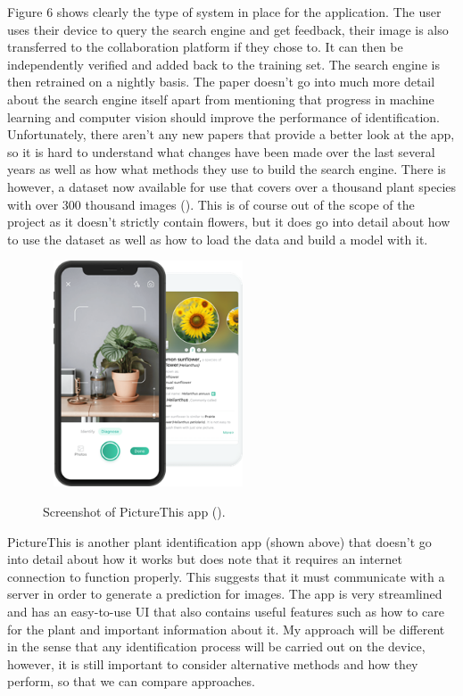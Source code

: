 \documentclass{article}
\begin{document}
Figure 6 shows clearly the type of system in place for the application. The user uses their device to query the search
engine and get feedback, their image is also transferred to the collaboration platform if they chose to. It can then be 
independently verified and added back to the training set. The search engine is then retrained on a nightly basis. The 
paper doesn't go into much more detail about the search engine itself apart from mentioning that progress in machine 
learning and computer vision should improve the performance of identification. Unfortunately, there aren't any new 
papers that provide a better look at the app, so it is hard to understand what changes have been made over the last 
several years as well as how what methods they use to build the search engine. There is however, a dataset now 
available for use that covers over a thousand plant species with over 300 thousand images 
(\cite{camille_garcin_2021_5645731}). This is of course out of the scope of the project as it doesn't strictly contain 
flowers, but it does go into detail about how to use the dataset as well as how to load the data and build a model with 
it.

\begin{figure}[h]\
    \centering
    \includegraphics[width=0.5\textwidth]{picturethis.png}
    \caption{Screenshot of PictureThis app (\cite{picturethis}).}
\end{figure}

PictureThis is another plant identification app (shown above) that doesn't go into detail about how it works but does 
note that it requires an internet connection to function properly. This suggests that it must communicate with a server 
in order to generate a prediction for images. The app is very streamlined and has an easy-to-use UI that also contains 
useful features such as how to care for the plant and important information about it. My approach will be different in 
the sense that any identification process will be carried out on the device, however, it is still important to consider 
alternative methods and how they perform, so that we can compare approaches.
\end{document}
